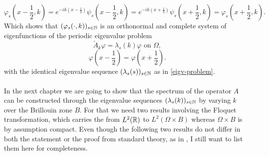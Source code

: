 		\[ \varphi_{s}(x - \frac{1}{2}, k) = e^{-ik(x - \frac{1}{2})} \psi_{s}(x - \frac{1}{2}, k) = e^{-ik(x + \frac{1}{2})} \psi_{s}(x + \frac{1}{2}, k) = \varphi_{s}(x + \frac{1}{2}, k). \]
Which shows that $(\varphi_{s}(\cdot, k))_{s \in \mathbb{N}}$ is an orthonormal and complete system of eigenfunctions of the periodic eigenvalue problem
	\begin{equation}
		\tilde{A}_{k} \varphi = \lambda_{s}(k)
		 \varphi \text{ on } \Omega, \label{mod-eigv-problem}
	\end{equation}
	\begin{equation}
		 \varphi(x - \frac{1}{2}) = \varphi(x + \frac{1}{2}). \label{periodic-condition}
	\end{equation}
with the identical eigenvalue sequence $(\lambda_{s}(s))_{s \in \mathbb{N}}$ as in \eqref{eigv-problem}.
~\\ ~\\
In the next chapter we are going to show that the spectrum of the operator $A$ can be constructed through the eigenvalue sequences $(\lambda_{s}(k))_{s \in \mathbb{N}}$ by varying $k$ over the Brillouin zone $B$. For that we need two results involving the Floquet transformation, which carries the from $L^{2}(\mathbb{R})$ to $L^{2}(\Omega \times B)$ whereas $\Omega \times B$ is by assumption compact. Even though the following two results do not differ in both the statement or the proof from standard theory, as in \cite{Plum10}, I still want to list them here for completeness.
